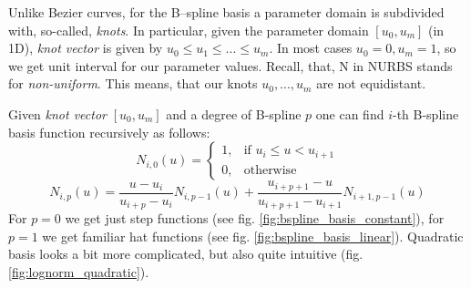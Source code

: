 Unlike Bezier curves, for the B--spline basis a parameter domain is subdivided with, so-called, \textit{knots}. In particular, given the parameter domain $[u_{0}, u_{m}]$ (in 1D), \textit{knot vector} is given by $u_{0} \leq u_{1} \leq ... \leq u_{m}$. In most cases $u_{0} = 0, u_{m} = 1$, so we get unit interval for our parameter values. Recall, that, N in NURBS stands for \textit{non-uniform}. This means, that our knots $u_{0},..., u_{m}$ are not equidistant.

Given \textit{knot vector} $[u_{0}, u_{m}]$ and a degree of B-spline $p$ one can find $i$-th B-spline basis function recursively as follows:
\begin{equation}
N_{i,0}(u) =  \begin{cases} 1, & \mbox{if } u_{i} \leq u < u_{i+1} \\ 0, & \mbox{otherwise } \end{cases}
\end{equation} 
\begin{equation}
N_{i,p}(u) = \frac{u - u_{i}}{u_{i+p} - u_{i}}N_{i, p-1}(u)  + \frac{u_{i+p+1}-u}{u_{i+p+1} - u_{i+1}}N_{i+1, p-1}(u)
\end{equation}
For $p=0$ we get just step functions (see fig. \ref{fig:bspline_basis_constant}), for $p=1$ we get familiar hat functions (see fig. \ref{fig:bspline_basis_linear}). Quadratic basis looks a bit more complicated, but also quite intuitive (fig. \ref{fig:lognorm_quadratic}).
